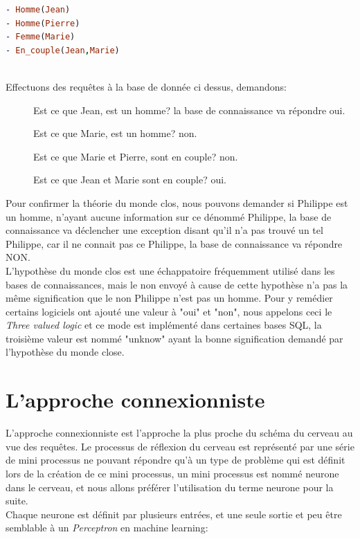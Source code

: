 \linebreak
\lstset{style=mlpythoncode}
\begin{lstlisting}[language=Prolog]
- Homme(Jean)
- Homme(Pierre)
- Femme(Marie)
- En_couple(Jean,Marie)
\end{lstlisting}
\ \\
Effectuons des requêtes à la base de donnée ci dessus, demandons:
\begin{description}
\item[] Est ce que Jean, est un homme? la base de connaissance va répondre oui.
\item[] Est ce que Marie, est un homme? non.
\item[] Est ce que Marie et Pierre, sont en couple? non.
\item[] Est ce que Jean et Marie sont en couple? oui.
\end{description}

Pour confirmer la théorie du monde clos, nous pouvons demander si Philippe est un homme, n'ayant aucune information sur ce dénommé Philippe, la base de connaissance va déclencher une exception disant qu'il n'a pas trouvé un tel Philippe, car il ne connait pas ce Philippe, la base de connaissance va répondre NON.\\ 
\linebreak L'hypothèse du monde clos est une échappatoire fréquemment utilisé dans les bases de connaissances, mais le non envoyé à cause de cette hypothèse n'a pas la même signification que le non Philippe n'est pas un homme. Pour y remédier certains logiciels ont ajouté une valeur à "oui" et "non", nous appelons ceci le \textit{Three valued logic} et ce mode est implémenté dans certaines bases SQL, la troisième valeur est nommé "unknow" ayant la bonne signification demandé par l'hypothèse du monde close.

\pagebreak
\section{L'approche connexionniste}
L'approche connexionniste est l'approche la plus proche du schéma du cerveau au vue des requêtes. Le processus de réflexion du cerveau est représenté par une série de mini processus ne pouvant répondre qu'à un type de problème qui est définit lors de la création de ce mini processus, un mini processus est nommé neurone dans le cerveau, et nous allons préférer l'utilisation du terme neurone pour la suite. \\
Chaque neurone est définit par plusieurs entrées, et une seule sortie et peu être semblable à un \textit{Perceptron} en machine learning:

